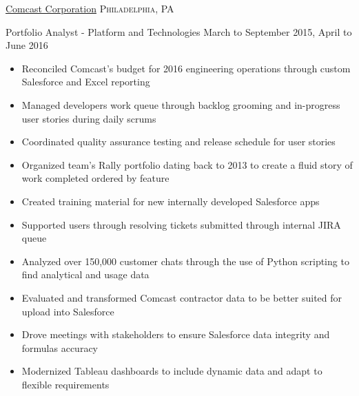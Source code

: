 \documentclass[10pt,letterpaper]{article}
\begin{document}
\headedsection
  {\href{http://corporate.comcast.com/}{Comcast Corporation}}
  {\textsc{Philadelphia, PA}} {%
  \headedsubsection
    {Portfolio Analyst - Platform and Technologies}
    {March to September 2015, April to June 2016}
    {\begin{itemize}
    \item Reconciled Comcast's budget for 2016 engineering operations through custom Salesforce and Excel reporting
    \item Managed developers work queue through backlog grooming and in-progress user stories during daily scrums
    \item Coordinated quality assurance testing and release schedule for user stories
    \item Organized team's Rally portfolio dating back to 2013 to create a fluid story of work completed ordered by feature
    \item Created training material for new internally developed Salesforce apps
    \item Supported users through resolving tickets submitted through internal JIRA queue
    \item Analyzed over 150,000 customer chats through the use of Python scripting to find analytical and usage data
    \item Evaluated and transformed Comcast contractor data to be better suited for upload into Salesforce
    \item Drove meetings with stakeholders to ensure Salesforce data integrity and formulas accuracy
    \item Modernized Tableau dashboards to include dynamic data and adapt to flexible requirements
    \end{itemize}}
}
\end{document}
